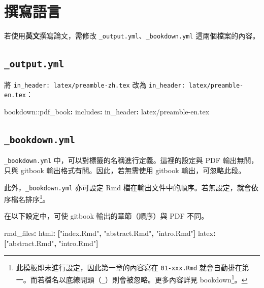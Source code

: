 \documentclass[]{book}
\newenvironment{Shaded}{}{}
\newcommand{\AttributeTok}[1]{\textcolor[rgb]{0.49,0.56,0.16}{#1}}
\newcommand{\FunctionTok}[1]{\textcolor[rgb]{0.02,0.16,0.49}{#1}}
\newcommand{\KeywordTok}[1]{\textcolor[rgb]{0.00,0.44,0.13}{\textbf{#1}}}
\newcommand{\StringTok}[1]{\textcolor[rgb]{0.25,0.44,0.63}{#1}}
\renewcommand{\href}[2]{#2\footnote{\url{#1}}}
\begin{document}
\hypertarget{write-lang}{%
\section{撰寫語言}\label{write-lang}}

若使用\textbf{英文}撰寫論文，需修改
\texttt{\_output.yml}、\texttt{\_bookdown.yml} 這兩個檔案的內容。

\hypertarget{output.yml}{%
\subsection{\texorpdfstring{\texttt{\_output.yml}}{\_output.yml}}\label{output.yml}}

將 \texttt{in\_header:\ latex/preamble-zh.tex} 改為
\texttt{in\_header:\ latex/preamble-en.tex}：

\begin{Shaded}
\begin{Highlighting}[]
\AttributeTok{bookdown:}\FunctionTok{:pdf\_book}\KeywordTok{:}
\AttributeTok{  }\FunctionTok{includes}\KeywordTok{:}
\AttributeTok{    }\FunctionTok{in\_header}\KeywordTok{:}\AttributeTok{ latex/preamble{-}en.tex}
\end{Highlighting}
\end{Shaded}

\hypertarget{bookdown.yml}{%
\subsection{\texorpdfstring{\texttt{\_bookdown.yml}}{\_bookdown.yml}}\label{bookdown.yml}}

\texttt{\_bookdown.yml} 中，可以對標籤的名稱進行定義。這裡的設定與 PDF
輸出無關，只與 gitbook 輸出格式有關。因此，若無需使用 gitbook
輸出，可忽略此段。

此外，\texttt{\_bookdown.yml} 亦可設定 Rmd
檔在輸出文件中的順序。若無設定，就會依序檔名排序\footnote{此模板即未進行設定，因此第一章的內容寫在
  \texttt{01-xxx.Rmd}
  就會自動排在第一。而若檔名以底線開頭（\texttt{\_}）則會被忽略。更多內容詳見
  \href{https://bookdown.org/yihui/bookdown/usage.html}{bookdown}。}。

在以下設定中，可使 gitbook 輸出的章節（順序）與 PDF 不同。

\begin{Shaded}
\begin{Highlighting}[]
\FunctionTok{rmd\_files}\KeywordTok{:}
\AttributeTok{  }\FunctionTok{html}\KeywordTok{:}\AttributeTok{ }\KeywordTok{[}\StringTok{"index.Rmd"}\KeywordTok{,}\AttributeTok{ }\StringTok{"abstract.Rmd"}\KeywordTok{,}\AttributeTok{ }\StringTok{"intro.Rmd"}\KeywordTok{]}
\AttributeTok{  }\FunctionTok{latex}\KeywordTok{:}\AttributeTok{ }\KeywordTok{[}\StringTok{"abstract.Rmd"}\KeywordTok{,}\AttributeTok{ }\StringTok{"intro.Rmd"}\KeywordTok{]}
\end{Highlighting}
\end{Shaded}
\end{document}
